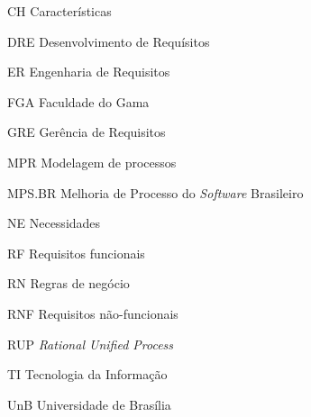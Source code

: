 \begin{siglas}
  \item[CH] Características
  \item[DRE] Desenvolvimento de Requísitos
  \item[ER] Engenharia de Requisitos
  \item[FGA] Faculdade do Gama
  \item[GRE] Gerência de Requisitos
  \item[MPR] Modelagem de processos
  \item[MPS.BR] Melhoria de Processo do \emph{Software} Brasileiro
  \item[NE] Necessidades
  \item[RF] Requisitos funcionais
  \item[RN] Regras de negócio
  \item[RNF] Requisitos não-funcionais
  \item[RUP] \emph{Rational Unified Process}
  \item[TI] Tecnologia da Informação
  \item[UnB] Universidade de Brasília
\end{siglas}
